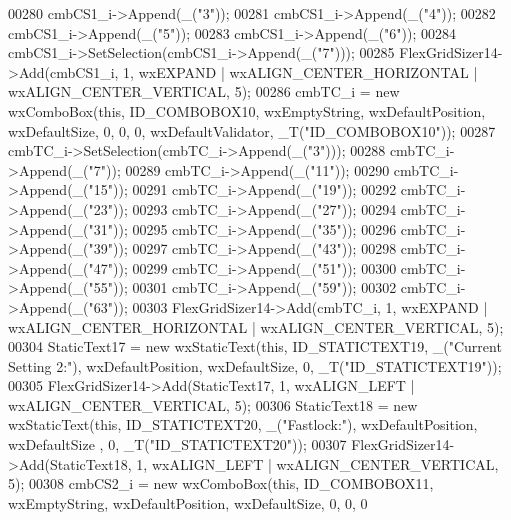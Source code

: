 \begin{DoxyCode}
00280     cmbCS1\_i->Append(\_(\textcolor{stringliteral}{"3"}));
00281     cmbCS1\_i->Append(\_(\textcolor{stringliteral}{"4"}));
00282     cmbCS1\_i->Append(\_(\textcolor{stringliteral}{"5"}));
00283     cmbCS1\_i->Append(\_(\textcolor{stringliteral}{"6"}));
00284     cmbCS1\_i->SetSelection(cmbCS1\_i->Append(\_(\textcolor{stringliteral}{"7"})));
00285     FlexGridSizer14->Add(cmbCS1\_i, 1, wxEXPAND | wxALIGN\_CENTER\_HORIZONTAL | wxALIGN\_CENTER\_VERTICAL, 5);
00286     cmbTC\_i = \textcolor{keyword}{new} wxComboBox(\textcolor{keyword}{this}, ID\_COMBOBOX10, wxEmptyString, wxDefaultPosition, wxDefaultSize, 0, 0, 0,
       wxDefaultValidator, \_T(\textcolor{stringliteral}{"ID\_COMBOBOX10"}));
00287     cmbTC\_i->SetSelection(cmbTC\_i->Append(\_(\textcolor{stringliteral}{"3"})));
00288     cmbTC\_i->Append(\_(\textcolor{stringliteral}{"7"}));
00289     cmbTC\_i->Append(\_(\textcolor{stringliteral}{"11"}));
00290     cmbTC\_i->Append(\_(\textcolor{stringliteral}{"15"}));
00291     cmbTC\_i->Append(\_(\textcolor{stringliteral}{"19"}));
00292     cmbTC\_i->Append(\_(\textcolor{stringliteral}{"23"}));
00293     cmbTC\_i->Append(\_(\textcolor{stringliteral}{"27"}));
00294     cmbTC\_i->Append(\_(\textcolor{stringliteral}{"31"}));
00295     cmbTC\_i->Append(\_(\textcolor{stringliteral}{"35"}));
00296     cmbTC\_i->Append(\_(\textcolor{stringliteral}{"39"}));
00297     cmbTC\_i->Append(\_(\textcolor{stringliteral}{"43"}));
00298     cmbTC\_i->Append(\_(\textcolor{stringliteral}{"47"}));
00299     cmbTC\_i->Append(\_(\textcolor{stringliteral}{"51"}));
00300     cmbTC\_i->Append(\_(\textcolor{stringliteral}{"55"}));
00301     cmbTC\_i->Append(\_(\textcolor{stringliteral}{"59"}));
00302     cmbTC\_i->Append(\_(\textcolor{stringliteral}{"63"}));
00303     FlexGridSizer14->Add(cmbTC\_i, 1, wxEXPAND | wxALIGN\_CENTER\_HORIZONTAL | wxALIGN\_CENTER\_VERTICAL, 5);
00304     StaticText17 = \textcolor{keyword}{new} wxStaticText(\textcolor{keyword}{this}, ID\_STATICTEXT19, \_(\textcolor{stringliteral}{"Current Setting 2:"}), wxDefaultPosition, 
      wxDefaultSize, 0, \_T(\textcolor{stringliteral}{"ID\_STATICTEXT19"}));
00305     FlexGridSizer14->Add(StaticText17, 1, wxALIGN\_LEFT | wxALIGN\_CENTER\_VERTICAL, 5);
00306     StaticText18 = \textcolor{keyword}{new} wxStaticText(\textcolor{keyword}{this}, ID\_STATICTEXT20, \_(\textcolor{stringliteral}{"Fastlock:"}), wxDefaultPosition, wxDefaultSize
      , 0, \_T(\textcolor{stringliteral}{"ID\_STATICTEXT20"}));
00307     FlexGridSizer14->Add(StaticText18, 1, wxALIGN\_LEFT | wxALIGN\_CENTER\_VERTICAL, 5);
00308     cmbCS2\_i = \textcolor{keyword}{new} wxComboBox(\textcolor{keyword}{this}, ID\_COMBOBOX11, wxEmptyString, wxDefaultPosition, wxDefaultSize, 0, 0, 0

\end{DoxyCode}
